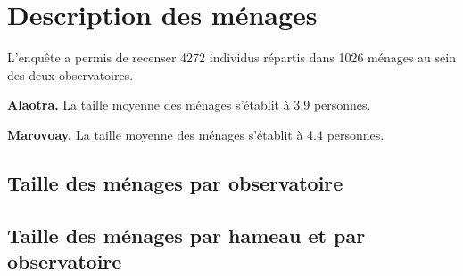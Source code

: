 \documentclass[
  french,
  letterpaper,
]{report}
\begin{document}
\section{Description des ménages}\label{description-des-muxe9nages}

L'enquête a permis de recenser 4272 individus répartis dans 1026 ménages
au sein des deux observatoires.

\textbf{Alaotra.} La taille moyenne des ménages s'établit à 3.9
personnes.

\textbf{Marovoay.} La taille moyenne des ménages s'établit à 4.4
personnes.

\subsection{Taille des ménages par
observatoire}\label{taille-des-muxe9nages-par-observatoire}

\begin{table}

\caption{\label{tbl-men-obs}Taille moyenne des ménages par observatoire}


\end{table}%

\subsection{Taille des ménages par hameau et par
observatoire}\label{taille-des-muxe9nages-par-hameau-et-par-observatoire}
\end{document}
